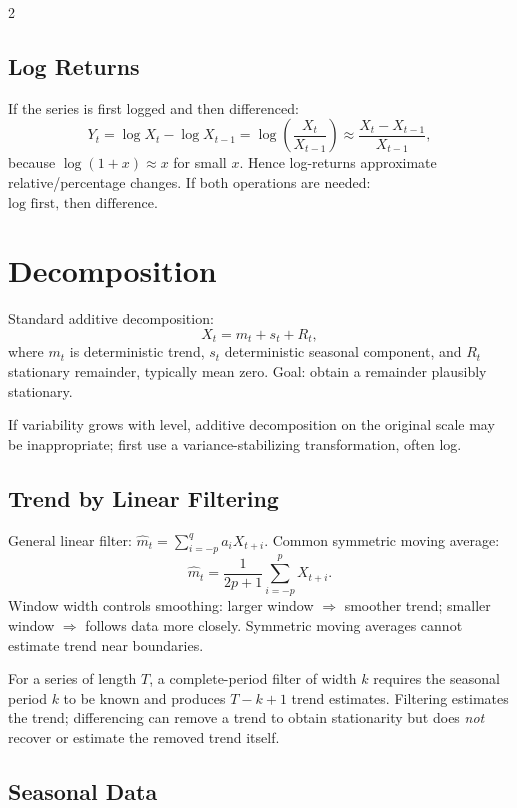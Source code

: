 \documentclass[9pt,a4paper]{extarticle}
\begin{document}
\begin{multicols}{2}
\subsection{Log Returns}

If the series is first logged and then differenced:
\[
Y_t=\log X_t-\log X_{t-1}
=\log\!\left(\frac{X_t}{X_{t-1}}\right)
\approx\frac{X_t-X_{t-1}}{X_{t-1}},
\]
because \(\log(1+x)\approx x\) for small \(x\). Hence log-returns approximate relative/percentage changes. If both operations are needed: \(\boxed{\text{log first, then difference}}\).

\section{Decomposition}

Standard additive decomposition:
\[
\boxed{X_t=m_t+s_t+R_t},
\]
where \(m_t\) is deterministic trend, \(s_t\) deterministic seasonal component, and \(R_t\) stationary remainder, typically mean zero. Goal: obtain a remainder plausibly stationary.

If variability grows with level, additive decomposition on the original scale may be inappropriate; first use a variance-stabilizing transformation, often log.

\subsection{Trend by Linear Filtering}

General linear filter:
\(\widehat m_t=\sum_{i=-p}^{q}a_iX_{t+i}\). Common symmetric moving average:
\[
\widehat m_t=\frac{1}{2p+1}\sum_{i=-p}^{p}X_{t+i}.
\]
Window width controls smoothing: larger window \(\Rightarrow\) smoother trend; smaller window \(\Rightarrow\) follows data more closely. Symmetric moving averages cannot estimate trend near boundaries.

For a series of length \(T\), a complete-period filter of width \(k\) requires the seasonal period \(k\) to be known and produces \(T-k+1\) trend estimates. Filtering estimates the trend; differencing can remove a trend to obtain stationarity but does \emph{not} recover or estimate the removed trend itself.

\subsection{Seasonal Data}


\end{multicols}
\end{document}
